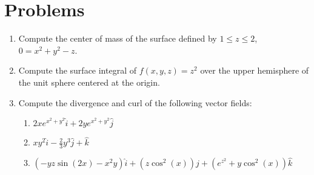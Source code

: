 \documentclass[letterpaper,11pt]{article}
\begin{document}
\section*{Problems}
\begin{enumerate}
\item Compute the center of mass of the surface defined by $1 \leq z \leq 2$, $0 = x^2 + y^2 - z$.
  \newpage
\item Compute the surface integral of $f(x, y, z) = z^2$ over the upper hemisphere of the unit sphere centered at the origin.
  \newline
  \newline
  \newline
  \newline
  \newline
  \newline
  \newline
  \newline
  \newline
  \newline
  \newline
  \newline
  \newline
  \newline
  \newline
  \newline
  \newline
\item Compute the divergence and curl of the following vector fields:
  \begin{enumerate}
  \item $2 x e^{x^2 + y^2} \hat{i} + 2 y e^{x^2 + y^2} \hat{j}$
    \newline
    \newline
    \newline
    \newline
    \newline
    \newline
  \item $x y^2 \hat{i} - \frac{2}{3} y^3 \hat{j} + \hat{k}$
    \newline
    \newline
    \newline
    \newline
    \newline
    \newline
  \item $(-y z \sin(2 x) - x^2 y) \hat{i} + (z \cos^2(x)) \hat{j} + (e^{z^2} + y \cos^2(x)) \hat{k}$
    \newline
    \newline
    \newline
    \newline
    \newline
    \newline
  \end{enumerate}
\end{enumerate}
\end{document}
